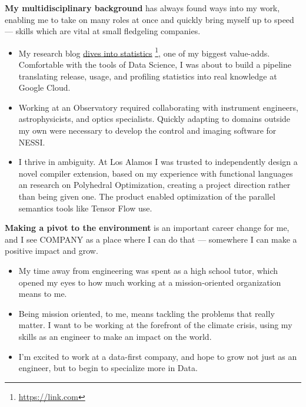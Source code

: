 \documentclass[sans, a4paper, 11pt]{article}
\newcommand{\cvcolor}[1]{{\color{MidnightBlue}#1}}
\renewcommand{\hl}[1]{\cvcolor{\textbf{#1}}}
\renewcommand{\cite}[2]{\href{#2}{\ul{#1}} \footnote{\href{#2}{#2}}}
\begin{document}
\begin{adjustwidth}{40pt}{40pt}
  \hl{My multidisciplinary background} has always found ways into my work,
  enabling me to take on many roles at once and quickly bring myself up to
  speed --- skills which are vital at small fledgeling companies.
  \begin{itemize}


    \item My research blog \cite{dives into statistics}{https://link.com}, one
      of my biggest value-adds. Comfortable with the tools of Data Science, I
      was about to build a pipeline translating release, usage, and profiling
      statistics into real knowledge at Google Cloud.

    \item Working at an Observatory required collaborating with instrument
      engineers, astrophysicists, and optics specialists. Quickly adapting to
      domains outside my own were necessary to develop the control and imaging
      software for NESSI.

    \item I thrive in ambiguity. At Los Alamos I was trusted to independently
      design a novel compiler extension, based on my experience with functional
      languages an research on Polyhedral Optimization, creating a project
      direction rather than being given one. The product enabled optimization
      of the parallel semantics tools like Tensor Flow use.
  \end{itemize} \medskip

  \hl{Making a pivot to the environment} is an important career change for me,
  and I see COMPANY as a place where I can do that --- somewhere I can make a
  positive impact and grow.
  \begin{itemize}
    \item My time away from engineering was spent as a high school tutor, which
      opened my eyes to how much working at a mission-oriented organization
      means to me.
    \item Being mission oriented, to me, means tackling the problems that
      really matter. I want to be working at the forefront of the climate
      crisis, using my skills as an engineer to make an impact on the world.
    \item I'm excited to work at a data-first company, and hope to grow not
      just as an engineer, but to begin to specialize more in Data.


\end{itemize}
\end{adjustwidth}
\end{document}
